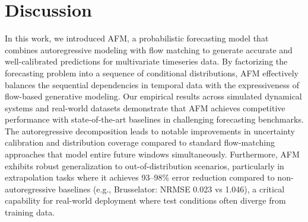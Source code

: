 \documentclass[a4paper,10pt,twocolumn,preprint,3p]{elsarticle}
\begin{document}
\section{Discussion}
In this work, we introduced AFM, a probabilistic forecasting model that combines autoregressive modeling with flow matching to generate accurate and well-calibrated predictions for multivariate timeseries data. By factorizing the forecasting problem into a sequence of conditional distributions, AFM effectively balances the sequential dependencies in temporal data with the expressiveness of flow-based generative modeling.
Our empirical results across simulated dynamical systems and real-world datasets demonstrate that AFM achieves competitive performance with state-of-the-art baselines in challenging forecasting benchmarks. The autoregressive decomposition leads to notable improvements in uncertainty calibration and distribution coverage compared to standard flow-matching approaches that model entire future windows simultaneously. Furthermore, AFM exhibits robust generalization to out-of-distribution scenarios, particularly in extrapolation tasks where it achieves 93--98\% error reduction compared to non-autoregressive baselines (e.g., Brusselator: NRMSE 0.023 vs 1.046), a critical capability for real-world deployment where test conditions often diverge from training data.
\end{document}
